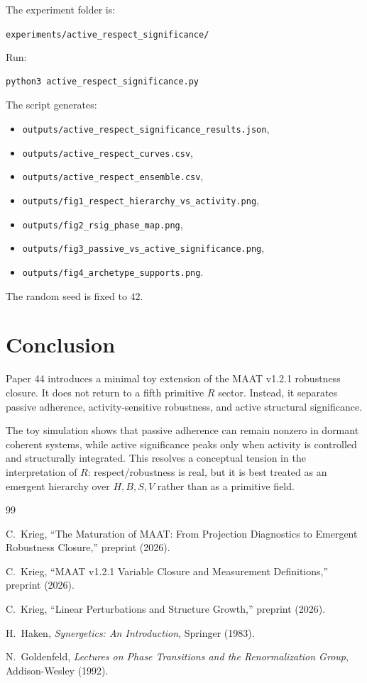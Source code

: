 \documentclass[11pt,a4paper]{article}
\begin{document}
The experiment folder is:
\begin{center}
\texttt{experiments/active\_respect\_significance/}
\end{center}

Run:
\begin{verbatim}
python3 active_respect_significance.py
\end{verbatim}

The script generates:
\begin{itemize}[leftmargin=1.5em]
\item \texttt{outputs/active\_respect\_significance\_results.json},
\item \texttt{outputs/active\_respect\_curves.csv},
\item \texttt{outputs/active\_respect\_ensemble.csv},
\item \texttt{outputs/fig1\_respect\_hierarchy\_vs\_activity.png},
\item \texttt{outputs/fig2\_rsig\_phase\_map.png},
\item \texttt{outputs/fig3\_passive\_vs\_active\_significance.png},
\item \texttt{outputs/fig4\_archetype\_supports.png}.
\end{itemize}

The random seed is fixed to $42$.

\section{Conclusion}

Paper 44 introduces a minimal toy extension of the MAAT v1.2.1 robustness
closure.
It does not return to a fifth primitive $R$ sector.
Instead, it separates passive adherence, activity-sensitive robustness, and
active structural significance.

The toy simulation shows that passive adherence can remain nonzero in dormant
coherent systems, while active significance peaks only when activity is
controlled and structurally integrated.
This resolves a conceptual tension in the interpretation of $R$:
respect/robustness is real, but it is best treated as an emergent hierarchy
over $H,B,S,V$ rather than as a primitive field.

\begin{thebibliography}{99}

C.~Krieg,
``The Maturation of MAAT: From Projection Diagnostics to Emergent Robustness
Closure,''
preprint (2026).

C.~Krieg,
``MAAT v1.2.1 Variable Closure and Measurement Definitions,''
preprint (2026).

C.~Krieg,
``Linear Perturbations and Structure Growth,''
preprint (2026).

H.~Haken,
\emph{Synergetics: An Introduction},
Springer (1983).

N.~Goldenfeld,
\emph{Lectures on Phase Transitions and the Renormalization Group},
Addison-Wesley (1992).

\end{thebibliography}
\end{document}
